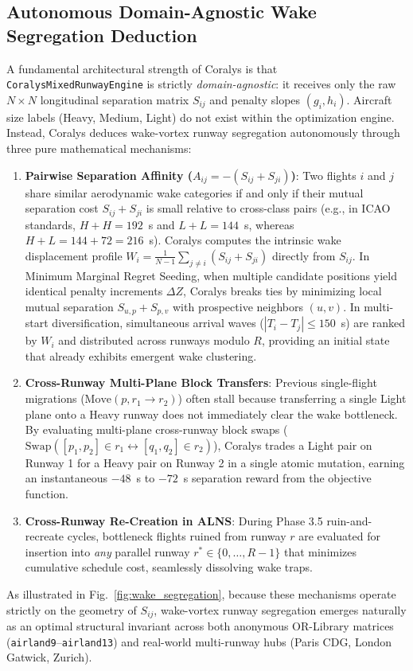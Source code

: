 \documentclass[10pt,journal,compsoc]{IEEEtran}
\begin{document}
\subsection{Autonomous Domain-Agnostic Wake Segregation Deduction}
A fundamental architectural strength of Coralys is that \texttt{CoralysMixedRunwayEngine} is strictly \emph{domain-agnostic}: it receives only the raw $N \times N$ longitudinal separation matrix $S_{ij}$ and penalty slopes $(g_i, h_i)$. Aircraft size labels (Heavy, Medium, Light) do not exist within the optimization engine. Instead, Coralys deduces wake-vortex runway segregation autonomously through three pure mathematical mechanisms:
\begin{enumerate}
    \item \textbf{Pairwise Separation Affinity ($A_{ij} = -(S_{ij} + S_{ji})$)}: Two flights $i$ and $j$ share similar aerodynamic wake categories if and only if their mutual separation cost $S_{ij} + S_{ji}$ is small relative to cross-class pairs (e.g., in ICAO standards, $H+H = 192$~s and $L+L = 144$~s, whereas $H+L = 144 + 72 = 216$~s). Coralys computes the intrinsic wake displacement profile $W_i = \frac{1}{N-1}\sum_{j \ne i} (S_{ij} + S_{ji})$ directly from $S_{ij}$. In Minimum Marginal Regret Seeding, when multiple candidate positions yield identical penalty increments $\Delta Z$, Coralys breaks ties by minimizing local mutual separation $S_{u, p} + S_{p, v}$ with prospective neighbors $(u, v)$. In multi-start diversification, simultaneous arrival waves ($|T_i - T_j| \le 150$~s) are ranked by $W_i$ and distributed across runways modulo $R$, providing an initial state that already exhibits emergent wake clustering.
    \item \textbf{Cross-Runway Multi-Plane Block Transfers}: Previous single-flight migrations ($\text{Move}(p, r_1 \to r_2)$) often stall because transferring a single Light plane onto a Heavy runway does not immediately clear the wake bottleneck. By evaluating multi-plane cross-runway block swaps ($\text{Swap}([p_1, p_2] \in r_1 \leftrightarrow [q_1, q_2] \in r_2)$), Coralys trades a Light pair on Runway 1 for a Heavy pair on Runway 2 in a single atomic mutation, earning an instantaneous $-48$~s to $-72$~s separation reward from the objective function.
    \item \textbf{Cross-Runway Re-Creation in ALNS}: During Phase 3.5 ruin-and-recreate cycles, bottleneck flights ruined from runway $r$ are evaluated for insertion into \emph{any} parallel runway $r^* \in \{0, \dots, R-1\}$ that minimizes cumulative schedule cost, seamlessly dissolving wake traps.
\end{enumerate}
As illustrated in Fig.~\ref{fig:wake_segregation}, because these mechanisms operate strictly on the geometry of $S_{ij}$, wake-vortex runway segregation emerges naturally as an optimal structural invariant across both anonymous OR-Library matrices (\texttt{airland9}--\texttt{airland13}) and real-world multi-runway hubs (Paris CDG, London Gatwick, Zurich).
\end{document}
